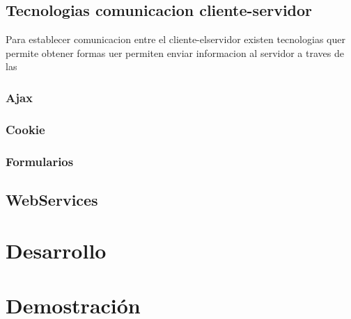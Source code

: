 \subsection{Tecnologias comunicacion cliente-servidor}
Para establecer comunicacion entre el cliente-elservidor existen tecnologias quer permite obtener formas uer permiten enviar informacion al servidor a traves de las
\subsubsection*{Ajax}
\subsubsection*{Cookie}
\subsubsection*{Formularios}
\subsection{WebServices}
\section{Desarrollo}
\section{Demostración}
